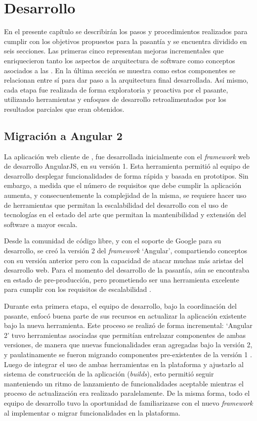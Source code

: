 \chapter{Desarrollo}

En el presente capítulo se describirán los pasos y procedimientos realizados para cumplir con los objetivos propuestos para la pasantía y se encuentra dividido en seis secciones. Las primeras cinco representan mejoras incrementales que enriquecieron tanto los aspectos de arquitectura de software como conceptos asociados a las \pwas. En la última sección se muestra como estos componentes se relacionan entre sí para dar paso a la arquitectura final desarrollada. Así mismo, cada etapa fue realizada de forma exploratoria y proactiva por el pasante, utilizando herramientas y enfoques de desarrollo retroalimentados por los resultados parciales que eran obtenidos.

\section{Migración a Angular 2}

La aplicación web cliente de \business, fue desarrollada inicialmente con el \textit{framework} web de desarrollo AngularJS, en su versión 1. Esta herramienta permitió al equipo de desarrollo desplegar funcionalidades de forma rápida y basada en prototipos. Sin embargo, a medida que el número de requisitos que debe cumplir la aplicación aumenta, y consecuentemente la complejidad de la misma, se requiere hacer uso de herramientas que permitan la escalabilidad del desarrollo con el uso de tecnologías en el estado del arte que permitan la mantenibilidad y extensión del software a mayor escala.

Desde la comunidad de código libre, y con el soporte de Google para su desarrollo, se creó la versión 2 del \textit{framework} `Angular', compartiendo conceptos con su versión anterior pero con la capacidad de atacar muchas más aristas del desarrollo web. Para el momento del desarrollo de la pasantía, aún se encontraba en estado de pre-producción, pero prometiendo ser una herramienta excelente para cumplir con los requisitos de escalabilidad \cite{angularchangelog}.

Durante esta primera etapa, el equipo de desarrollo, bajo la coordinación del pasante, enfocó buena parte de sus recursos en actualizar la aplicación existente bajo la nueva herramienta. Este proceso se realizó de forma incremental: `Angular 2' tuvo herramientas asociadas que permitían entrelazar componentes de ambas versiones, de manera que nuevas funcionalidades eran agregadas bajo la versión 2, y paulatinamente se fueron migrando componentes pre-existentes de la versión 1 \cite{angularupgrade}. Luego de integrar el uso de ambas herramientas en la plataforma y ajustarlo al sistema de construcción de la aplicación (\textit{builds}), esto permitió seguir manteniendo un ritmo de lanzamiento de funcionalidades aceptable mientras el proceso de actualización era realizado paralelamente. De la misma forma, todo el equipo de desarrollo tuvo la oportunidad de familiarizarse con el nuevo \textit{framework} al implementar o migrar funcionalidades en la plataforma.

